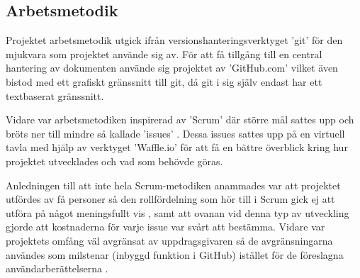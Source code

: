 
    \newpage

    \subsection{Arbetsmetodik} %
    \label{sub:arbetsmetodik}
        Projektet arbetsmetodik utgick ifrån versionshanteringsverktyget 'git' 
        för den mjukvara som projektet använde sig av. För att få tillgång 
        till en central hantering av dokumenten använde sig projektet av 'GitHub.com' vilket även bistod med ett grafiskt gränssnitt till git, då git i sig själv endast har ett textbaserat gränssnitt. \bigskip

        Vidare var arbetsmetodiken inspirerad av 'Scrum' där större mål sattes upp och bröts ner till mindre så kallade 'issues' \cite[kap.~8]{scrum}. Dessa issues sattes upp på en virtuell tavla med hjälp av verktyget 'Waffle.io' för att få en bättre överblick kring hur projektet utvecklades och vad som behövde göras. \bigskip

        Anledningen till att inte hela Scrum-metodiken anammades var att projektet utfördes av få personer så den rollfördelning som hör till i Scrum gick ej att utföra på något meningsfullt vis \cite[kap.~6]{scrum}, samt att ovanan vid denna typ av utveckling gjorde att kostnaderna för varje issue var svårt att bestämma. Vidare var projektets omfång väl avgränsat av uppdrags\-givaren så de avgränsningarna användes som milstenar (inbyggd funktion i GitHub) istället för de föreslagna användarberättelserna \cite[kap.~9]{scrum}. 

